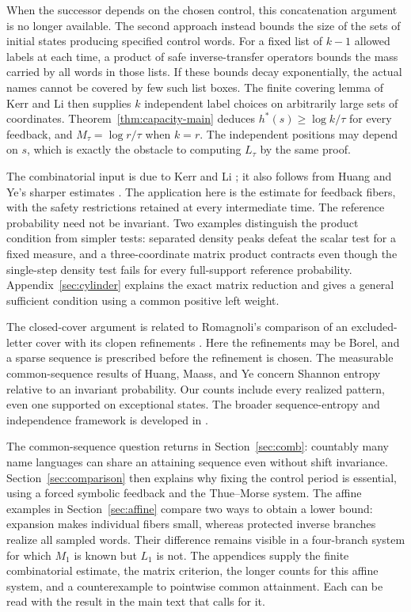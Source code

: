 \documentclass[11pt,reqno]{amsart}
\numberwithin{equation}{section}
\theoremstyle{definition}
\theoremstyle{definition}
\begin{document}
When the successor depends on the chosen control, this concatenation
argument is no longer available. The second approach instead bounds
the size of the sets of initial states producing specified control
words. For a fixed list of $k-1$ allowed labels at each time, a product
of safe inverse-transfer operators bounds the mass carried by all words
in those lists. If these bounds decay exponentially, the actual names
cannot be covered by few such list boxes. The finite covering lemma
of Kerr and Li then supplies $k$ independent label choices on
arbitrarily large sets of coordinates. Theorem~\ref{thm:capacity-main}
deduces $h^*(s)\ge\log k/\tau$ for every feedback, and
$M_\tau=\log r/\tau$ when $k=r$. The independent positions may
depend on $s$, which is exactly the obstacle to computing $L_\tau$
by the same proof.

The combinatorial input is due to Kerr and Li
\cite[Lemma~3.3]{KL2007}; it also follows from Huang and Ye's
sharper estimates \cite[Lemma~4.1 and Remark~4.2]{HuangYe2009}.
The application here is the estimate for feedback fibers, with the
safety restrictions retained at every intermediate time. The reference
probability need not be invariant. Two examples distinguish the product
condition from simpler tests: separated density peaks defeat the scalar
test for a fixed measure, and a three-coordinate matrix product contracts
even though the single-step density test fails for every full-support
reference probability. Appendix~\ref{sec:cylinder} explains the exact
matrix reduction and gives a general sufficient condition using a
common positive left weight.

The closed-cover argument is related to Romagnoli's comparison of
an excluded-letter cover with its clopen refinements
\cite{Romagnoli2007}. Here the refinements may be Borel, and a
sparse sequence is prescribed before the refinement is chosen.
The measurable common-sequence results of Huang, Maass, and Ye
\cite[Lemma~3.3 and Theorem~3.5]{HuangMaassYe2004} concern
Shannon entropy relative to an invariant probability. Our counts
include every realized pattern, even one supported on exceptional
states. The broader sequence-entropy and independence framework is
developed in \cite{Goodman1974,Hulse1982,KamaeZamboniSystems2002,
KL2007,KL2009}.

The common-sequence question returns in Section~\ref{sec:comb}:
countably many name languages can share an attaining sequence even
without shift invariance. Section~\ref{sec:comparison} then explains
why fixing the control period is essential, using a forced symbolic
feedback and the Thue--Morse system. The affine examples in
Section~\ref{sec:affine} compare two ways to obtain a lower bound:
expansion makes individual fibers small, whereas protected inverse
branches realize all sampled words. Their difference remains visible
in a four-branch system for which $M_1$ is known but $L_1$ is not.
The appendices supply the finite combinatorial estimate, the matrix
criterion, the longer counts for this affine system, and a counterexample
to pointwise common attainment. Each can be read with the result in the
main text that calls for it.
\end{document}
